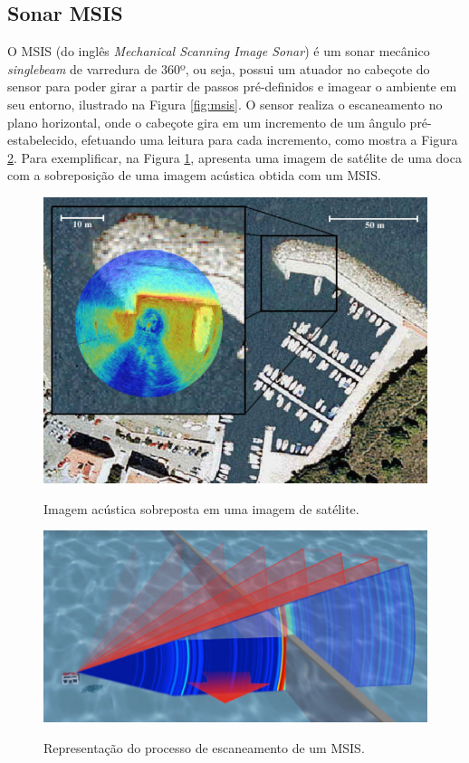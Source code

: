 \subsection{Sonar MSIS}
\label{sec:msis}
O MSIS (do inglês \textit{Mechanical Scanning Image Sonar}) é um sonar mecânico \textit{singlebeam} de varredura de 360º, ou seja, possui um atuador no cabeçote do sensor para poder girar a partir de passos pré-definidos e imagear o ambiente em seu entorno, ilustrado na Figura \ref{fig:msis}. 
O sensor realiza o escaneamento no plano horizontal, onde o cabeçote gira em um incremento de um ângulo pré-estabelecido, efetuando uma leitura para cada incremento, como mostra a Figura \ref{fig:msis-scanning}.
Para exemplificar, na Figura \ref{fig:msis-image}, apresenta uma imagem de satélite de uma doca com a sobreposição de uma imagem acústica obtida com um MSIS.

\begin{figure}[H]
    \centering
    \caption{Imagem acústica sobreposta em uma imagem de satélite.}
    \includegraphics[scale=0.3]{dados/figuras/msis_image.png}
    \label{fig:msis-image}
\end{figure}

\begin{figure}[H]
    \centering
    \caption{Representação do processo de escaneamento de um MSIS.}
    \includegraphics[scale=0.3]{dados/figuras/msis-scanning.png}
    \label{fig:msis-scanning}
\end{figure}

